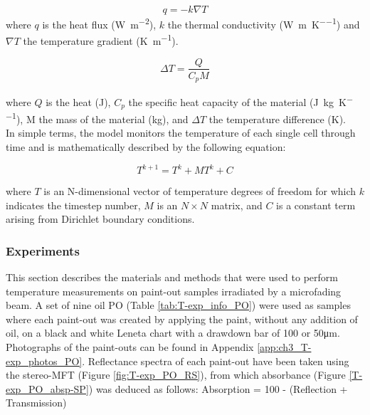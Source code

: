 \begin{equation}
    q = -k \nabla T
\label{eq:Fourier_law}
\end{equation}
where $q$ is the heat flux (\unit{\watt\per\square\metre}), $k$ the thermal conductivity (\unit{\watt\per\metre\per\kelvin}) and $\nabla T$ the temperature gradient (\unit{\kelvin\per\metre}).

\begin{equation}
    \Delta T = \frac{Q}{C_p M}
\label{eq:thermodynamic_law}
\end{equation}
                   
where $Q$ is the heat (\unit{\joule}), $C_p$ the specific heat capacity of the material (\unit{\joule\per\kg\per\kelvin}), M the mass of the material (\unit{\kg}), and $\Delta T$ the temperature difference (\unit{\kelvin}).\\


In simple terms, the model monitors the temperature of each single cell through time and is mathematically described by the following equation:

$$T^{k+1} = T^k + M T^k + C$$   
                       
where $T$ is an N-dimensional vector of temperature degrees of freedom for which $k$ indicates the timestep number, $M$ is an $N \times N$ matrix, and $C$ is a constant term arising from Dirichlet boundary conditions.

\newpage
\subsubsection{Experiments}

This section describes the materials and methods that were used to perform temperature measurements on paint-out samples irradiated by a microfading beam. A set of nine oil \gls{PO} (Table \ref{tab:T-exp_info_PO}) were used as samples where each paint-out was created by applying the paint, without any addition of oil, on a black and white Leneta chart\textsuperscript{\textregistered} with a drawdown bar of 100 or 50\unit{\micro\metre}. Photographs of the paint-outs can be found in Appendix \ref{app:ch3_T-exp_photos_PO}. Reflectance spectra of each paint-out have been taken using the stereo-MFT (Figure \ref{fig:T-exp_PO_RS}), from which absorbance (Figure \ref{T-exp_PO_absp-SP}) was deduced as follows:
Absorption = 100 - (Reflection + Transmission)


